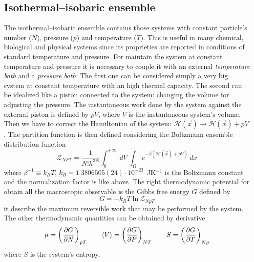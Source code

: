 \subsection{Isothermal--isobaric ensemble}
The isothermal--isobaric ensemble contains those systems with constant particle's number ($N$), pressure ($p$) and temperature ($T$). This is useful in many chemical, biological and physical systems since its proprieties are reported in conditions of standard temperature and pressure. For maintain the system at constant temperature and pressure it is necessary to couple it with an external \textit{temperature bath} and a \textit{pressure bath}. The first one can be considered simply a very big system at constant temperature with an high thermal capacity. The second can be idealized like a piston connected to the system: changing the volume for adjusting the pressure. The instantaneous work done by the system against the external piston is defined by $pV$, where $V$ is the instantaneous system's volume. Then we have to correct the Hamiltonian of the system: $\mathcal{H}(\vec x) \rightarrow \mathcal{H}(\vec x) + pV$. The partition function is then defined considering the Boltzmann ensemble distribution function
\begin{equation*}
	\mathcal{Z}_{NPT} = \frac{1}{N!h^{3N}}\int_0^{+\infty}\ dV \ \int_\Omega e^{-\beta(\mathcal{H}(\vec x) + pV)}\ dx
\end{equation*}
where $\beta^{-1} \equiv k_B T$, $k_B = 1.3806505(24) \cdot 10^{-23}$~JK$^{-1}$ is the Boltzmann constant and the normalization factor is like above. The right thermodynamic potential for obtain all the macroscopic observable is the Gibbs free energy $G$ defined by
\begin{equation*}
	G = -k_B T\ln \mathcal{Z}_{NpT}
\end{equation*}
it describe the maximum reversible work that may be performed by the system. The other thermodynamic quantities can be obtained by derivative
\begin{equation*}
	\mu = \left ( \frac{\partial G}{\partial N}\right )_{pT} \qquad \langle V \rangle = \left ( \frac{\partial G}{\partial P}\right )_{NT} \qquad S = \left ( \frac{\partial G}{\partial T}\right )_{Np}
\end{equation*}
where $S$ is the system's entropy.


